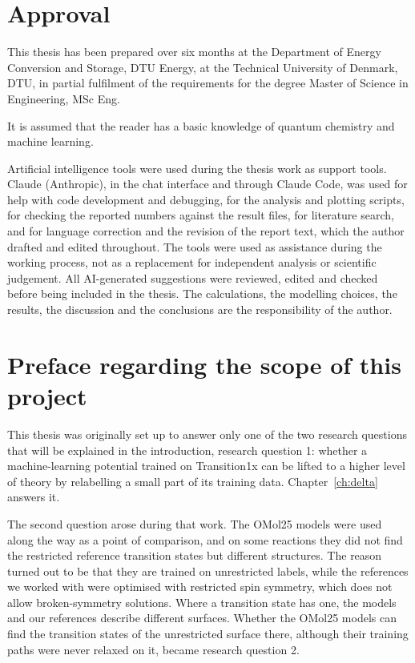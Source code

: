 
\section*{Approval}
This thesis has been prepared over six months at the Department of
Energy Conversion and Storage, DTU Energy, at the Technical University
of Denmark, DTU, in partial fulfilment of the requirements for the
degree Master of Science in Engineering, MSc Eng.

It is assumed that the reader has a basic knowledge of quantum
chemistry and machine learning.

Artificial intelligence tools were used during the thesis work as
support tools. Claude (Anthropic), in the chat interface and through
Claude Code, was used for help with code development and debugging,
for the analysis and
plotting scripts, for checking the reported numbers against the
result files, for literature search, and for language correction and
the revision of the report text, which the author drafted and edited
throughout. The tools were used as assistance during the working
process, not as a replacement for independent analysis or scientific
judgement. All AI-generated suggestions were reviewed, edited and
checked before being included in the thesis. The calculations, the
modelling choices, the results, the discussion and the conclusions
are the responsibility of the author.

\vfill

\begin{center}
\namesigdate{\thesisauthor~-~\studentnumber}
\end{center}

\vfill

\newpage
\section*{Preface regarding the scope of this project}
This thesis was originally set up to answer only one of the two
research questions that will be explained in the introduction,
research question 1: whether a machine-learning potential trained on
Transition1x can be lifted to a higher level of theory by relabelling
a small part of its training data. Chapter~\ref{ch:delta} answers it.

The second question arose during that work. The OMol25 models were
used along the way as a point of comparison, and on some reactions
they did not find the restricted reference transition states but
different structures. The reason turned out to be that they are
trained on unrestricted labels, while the references we worked with
were optimised with restricted spin symmetry, which does not allow
broken-symmetry solutions. Where a transition state has one, the models
and our references describe different surfaces. Whether the OMol25
models can find the transition states of the unrestricted surface
there, although their training paths were never relaxed on it, became
research question 2.

